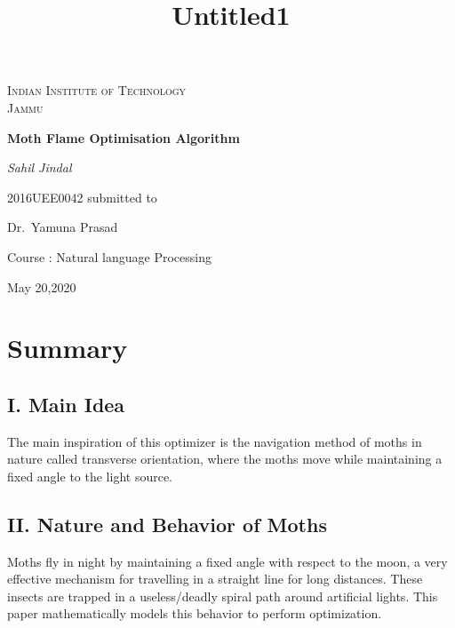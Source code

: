 \documentclass[12pt,a4paper]{report}
\title{Untitled1}
\begin{document}
\begin{titlepage}
	\centering
	{\scshape\LARGE Indian Institute of Technology\\ Jammu \par}
	\vspace{4cm}
	{\huge\bfseries Moth Flame Optimisation Algorithm\par}
	\vspace{2cm}
	{\Large\itshape Sahil Jindal\par}
	{2016UEE0042 }
	\vfill
	submitted to\par
	Dr.~Yamuna Prasad \par
	Course : Natural language Processing

	\vfill

	{\large May 20,2020\par}
\end{titlepage}



\newpage
\section*{Summary}
\vspace{2cm}
\subsection*{I.\hspace{5pt}	 Main Idea}

The main inspiration of this optimizer is the navigation method of moths in nature called transverse orientation, where the moths move while maintaining a fixed angle to the light source.

\subsection*{II.\hspace{5pt}	Nature and Behavior of Moths}

Moths fly in night by maintaining a fixed angle with respect to the moon, a very effective mechanism for travelling in a straight line for long distances. These insects are trapped in a useless/deadly spiral path around artificial lights. This paper mathematically models this behavior to perform optimization.
\end{document}

